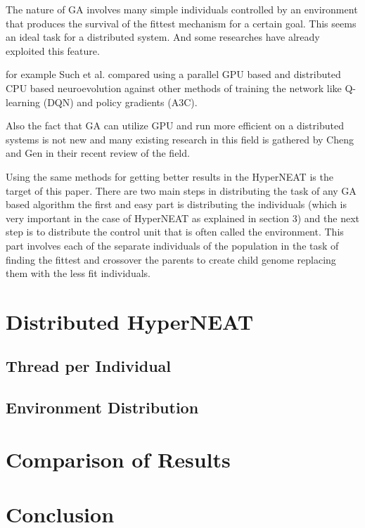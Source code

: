 \documentclass[twocolumn]{article}
\begin{document}
The nature of GA involves many simple individuals 
controlled by an environment that produces the 
survival of the fittest mechanism for a certain goal.
This seems an ideal task for a distributed system.
And some researches have already exploited this 
feature.

for example Such et al. compared using a parallel
GPU based and distributed CPU based neuroevolution
against other methods of training the network like
Q-learning (DQN) and policy gradients (A3C).
\cite{GA-GPU-Comparison}

Also the fact that GA can utilize GPU and run more
efficient on a distributed systems is not new and 
many existing research in this field is gathered
by Cheng and Gen in their recent review of the field.
\cite{GA-GPU-Review}

Using the same methods for getting better results 
in the HyperNEAT is the target of this paper. There
are two main steps in distributing the task of any GA
based algorithm the first and easy part is distributing
the individuals (which is very important in the case
of HyperNEAT as explained in section 3) and the next
step is to distribute the control unit that is often
called the environment. This part involves each of
the separate individuals of the population in the 
task of finding the fittest and crossover the parents
to create child genome replacing them with the less
fit individuals.


\section{Distributed HyperNEAT}
\subsection{Thread per Individual}
\subsection{Environment Distribution}


\section{Comparison of Results}


\section{Conclusion}




\end{document}
